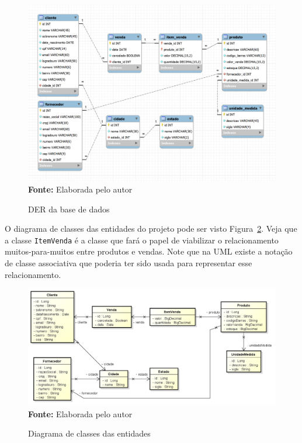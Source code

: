 \FloatBarrier
\begin{figure}[!htbp]
    \centering
    \caption{DER da base de dados}
    \includegraphics[scale=0.4]{imagens/cap08DER}
    \\\textbf{Fonte:} Elaborada pelo autor
    \label{fig:cap08DER}
\end{figure}
\FloatBarrier

O diagrama de classes das entidades do projeto pode ser visto Figura~\ref{fig:cap08DiagramaClasses}. Veja que a classe \texttt{ItemVenda} é a classe que fará o papel de viabilizar o relacionamento muitos-para-muitos entre produtos e vendas. Note que na UML existe a notação de classe associativa que poderia ter sido usada para representar esse relacionamento.

\FloatBarrier
\begin{figure}[!htbp]
    \centering
    \caption{Diagrama de classes das entidades}
    \includegraphics[scale=0.45]{imagens/cap08DiagramaClasses}
    \\\textbf{Fonte:} Elaborada pelo autor
    \label{fig:cap08DiagramaClasses}
\end{figure}
\FloatBarrier

